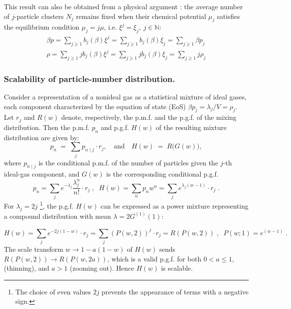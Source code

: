 \documentclass[a4paper,12pt]{amsart}
\newcommand{\N}{\mathbb{N}}
\theoremstyle{definition}
\theoremstyle{remark}
\begin{document}
This result can also be obtained from a physical argument \cite{Hill}: the average number of $j$-particle clusters $N_j$ remains fixed  when their chemical potential $\mu_j$  satisfies the equilibrium condition  $\mu_j=j\mu$, i.e. $\xi^j=\xi_j, ~j\in\N$:
 \begin{eqnarray}
  \beta p = \sum_{j\geq1}b_j(\beta)\xi^j =  \sum_{j\geq1}b_j(\beta)\xi_j = \sum_{j\geq1}\beta p_j\, \nonumber \\ 
 \rho =  \sum_{j\geq1} j b_j(\beta) \xi^j =  \sum_{j\geq1} j b_j(\beta) \xi_j = \sum_{j\geq1}j \rho_j 
 \label{multideal}
 \end{eqnarray} 


\subsubsection{Scalability of particle-number distribution.}
Consider a representation of a nonideal gas as a statistical mixture of ideal gases, each component characterized by the equation of state (EoS) $\beta p_j = \lambda_j / V = \rho_j$. Let $r_j$ and $R(w)$ denote, respectively, the p.m.f. and the p.g.f. of the mixing distribution. Then the p.m.f. $p_n$ and p.g.f. $H(w)$ of the resulting mixture distribution are given by:
\[
p_n \;=\; \sum_{j} p_{n\mid j}\cdot r_j ,
\quad\text{and}\quad
H(w) \;=\; R\bigl(G(w)\bigr),
\]
where $p_{n\mid j}$ is the conditional p.m.f. of the number of particles given the $j$-th ideal-gas component, and $G(w)$ is the corresponding conditional p.g.f.\begin{equation}\label{mix}
p_n=\sum_j e^{-\lambda_j} \frac{\lambda_j^n}{n!}\cdot r_j \;,\;\; H(w)=\sum_n p_n w^n=\sum_j  e^{\lambda_j(w-1)} \cdot r_j \;.
\end{equation}
For $\lambda_j=2j$ \footnote{The choice of even values $2j$ prevents the appearance of terms with a negative sign.}, the p.g.f. $H(w)$ can be expressed as a power mixture\cite{StvH2004}  representing a compound distribution with  mean 
$\lambda =  2G^{(1)}(1)$:

\begin{equation}\label{mixpoipgf}
 H(w)=\sum_j e^{-2j(1-w)}\cdot r_j = \sum_j (P(w,2))^j \cdot r_j=R(P(w,2)) \;,\;\; P(w;1)= e^{(w-1)} \;.
\end{equation}
The scale transform $w\to 1-a(1-w)$ of $H(w)$ sends $R(P(w,2)) \to R(P(w,2a))$, which is a valid p.g.f. for both $0<a\leq 1$, (thinning), and $a>1$ (zooming out). Hence $H(w)$ is scalable.
\end{document}
